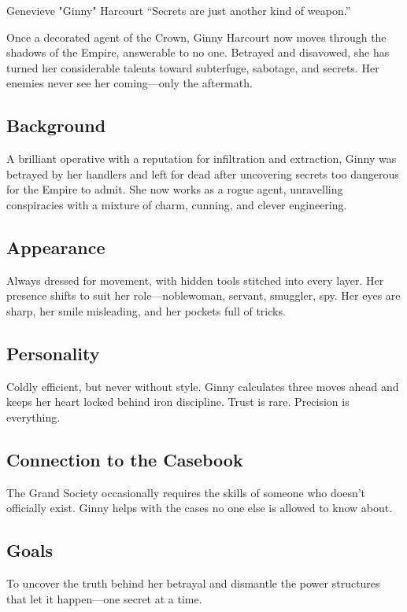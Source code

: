 \begin{WyrdCharacterSheet}
    {Genevieve "Ginny" Harcourt} 
    {“Secrets are just another kind of weapon.”}
    \label{pc:ginny-harcourt}

    Once a decorated agent of the Crown, Ginny Harcourt now moves through the shadows of the Empire, answerable to no one. Betrayed and disavowed, she has turned her considerable talents toward subterfuge, sabotage, and secrets. Her enemies never see her coming—only the aftermath.

    \subsection{Background}
    A brilliant operative with a reputation for infiltration and extraction, Ginny was betrayed by her handlers and left for dead after uncovering secrets too dangerous for the Empire to admit. She now works as a rogue agent, unravelling conspiracies with a mixture of charm, cunning, and clever engineering.

    \subsection{Appearance}
    Always dressed for movement, with hidden tools stitched into every layer. Her presence shifts to suit her role—noblewoman, servant, smuggler, spy. Her eyes are sharp, her smile misleading, and her pockets full of tricks.

    \subsection{Personality}
    Coldly efficient, but never without style. Ginny calculates three moves ahead and keeps her heart locked behind iron discipline. Trust is rare. Precision is everything.

    \subsection{Connection to the Casebook}
    The Grand Society occasionally requires the skills of someone who doesn’t officially exist. Ginny helps with the cases no one else is allowed to know about.

    \subsection{Goals}
    To uncover the truth behind her betrayal and dismantle the power structures that let it happen—one secret at a time.


\end{WyrdCharacterSheet}
